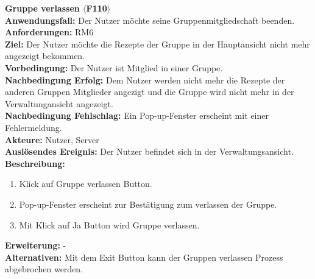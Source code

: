 \documentclass[parskip=full]{scrartcl}
\begin{document}
\textbf{Gruppe verlassen $\langle$F110$\rangle$}\\
\textbf{Anwendungsfall:} Der Nutzer möchte seine Gruppenmitgliedschaft beenden.\\
\textbf{Anforderungen:} RM6\\
\textbf{Ziel:} Der Nutzer möchte die Rezepte der Gruppe in der Hauptansicht nicht mehr angezeigt bekommen.\\
\textbf{Vorbedingung:} Der Nutzer ist Mitglied in einer Gruppe. \\
\textbf{Nachbedingung Erfolg:} Dem Nutzer werden nicht mehr die Rezepte der anderen Gruppen Mitglieder angezigt und die Gruppe wird nicht mehr in der Verwaltungansicht angezeigt.\\
\textbf{Nachbedingung Fehlschlag:} Ein Pop-up-Fenster erscheint mit einer Fehlermeldung.\\
\textbf{Akteure:} Nutzer, Server\\
\textbf{Auslösendes Ereignis:} Der Nutzer befindet sich in der Verwaltungsansicht.\\
\textbf{Beschreibung:}
\begin{enumerate}
    \item Klick auf Gruppe verlassen Button.
    \item Pop-up-Fenster erscheint zur Bestätigung zum verlassen der Gruppe.
    \item Mit Klick auf Ja Button wird Gruppe verlassen.
\end{enumerate}
\textbf{Erweiterung:} -\\
\textbf{Alternativen:} Mit dem Exit Button kann der Gruppen verlassen Prozess abgebrochen werden.\\
\newpage
\end{document}
